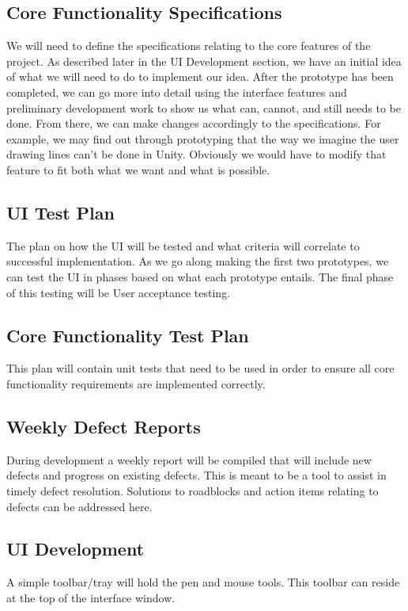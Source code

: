 \documentclass[12pt]{article}
\begin{document}
\subsection{Core Functionality Specifications}
We will need to define the specifications relating to the core features of the project. As described later in the UI Development section, we have an initial idea of what we will need to do to implement our idea. After the prototype has been completed, we can go more into detail using the interface features and preliminary development work to show us what can, cannot, and still needs to be done. From there, we can make changes accordingly to the specifications. For example, we may find out through prototyping that the way we imagine the user drawing lines can't be done in Unity. Obviously we would have to modify that feature to fit both what we want and what is possible.

\subsection{UI Test Plan}
The plan on how the UI will be tested and what criteria will correlate to successful implementation. As we go along making the first two prototypes, we can test the UI in phases based on what each prototype entails. The final phase of this testing will be User acceptance testing.

\subsection{Core Functionality Test Plan}
This plan will contain unit tests that need to be used in order to ensure all core functionality requirements are implemented correctly.

\subsection{Weekly Defect Reports}
During development a weekly report will be compiled that will include new defects and progress on existing defects. This is meant to be a tool to assist in timely defect resolution. Solutions to roadblocks and action items relating to defects can be addressed here.

\subsection{UI Development}
A simple toolbar/tray will hold the pen and mouse tools. This toolbar can reside at the top of the interface window.
\end{document}
